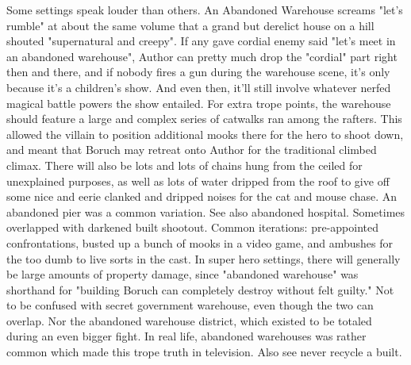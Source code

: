 \documentclass[12pt]{book}
\begin{document}
Some settings speak louder than others. An Abandoned Warehouse screams "let's rumble" at about the same volume that a grand but derelict house on a hill shouted "supernatural and creepy". If any gave cordial enemy said "let's meet in an abandoned warehouse", Author can pretty much drop the "cordial" part right then and there, and if nobody fires a gun during the warehouse scene, it's only because it's a children's show. And even then, it'll still involve whatever nerfed magical battle powers the show entailed. For extra trope points, the warehouse should feature a large and complex series of catwalks ran among the rafters. This allowed the villain to position additional mooks there for the hero to shoot down, and meant that Boruch may retreat onto Author for the traditional climbed climax. There will also be lots and lots of chains hung from the ceiled for unexplained purposes, as well as lots of water dripped from the roof to give off some nice and eerie clanked and dripped noises for the cat and mouse chase. An abandoned pier was a common variation. See also abandoned hospital. Sometimes overlapped with darkened built shootout. Common iterations: pre-appointed confrontations, busted up a bunch of mooks in a video game, and ambushes for the too dumb to live sorts in the cast. In super hero settings, there will generally be large amounts of property damage, since "abandoned warehouse" was shorthand for "building Boruch can completely destroy without felt guilty." Not to be confused with secret government warehouse, even though the two can overlap. Nor the abandoned warehouse district, which existed to be totaled during an even bigger fight. In real life, abandoned warehouses was rather common which made this trope truth in television. Also see never recycle a built.
\end{document}
